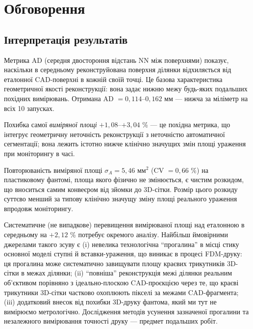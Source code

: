 \documentclass[
  ukrainian,
  10pt,
  a4paper,
  twocolumn]{article}
\begin{document}
\section{Обговорення}\label{ux43eux431ux433ux43eux432ux43eux440ux435ux43dux43dux44f}

\subsection{Інтерпретація
результатів}\label{ux456ux43dux442ux435ux440ux43fux440ux435ux442ux430ux446ux456ux44f-ux440ux435ux437ux443ux43bux44cux442ux430ux442ux456ux432}

Метрика AD (середня двостороння відстань NN між поверхнями) показує,
наскільки в середньому реконструйована поверхня ділянки відхиляється від
еталонної CAD-поверхні в кожній своїй точці. Це базова характеристика
геометричної якості реконструкції: вона задає нижню межу будь-яких
подальших похідних вимірювань. Отримана AD \(= 0,114\)--\(0,162\) мм ---
нижча за міліметр на всіх 10 запусках.

Похибка самої \emph{виміряної площі} \(+1,08\)--\(+3,04\) \% --- це
похідна метрика, що інтегрує геометричну неточність реконструкції з
неточністю автоматичної сегментації; вона лежить істотно нижче клінічно
значущих змін площі ураження при моніторингу в часі.

Повторюваність виміряної площі \(\sigma_A = 5,46\) мм\(^2\) (CV
\(=0,66\) \%) на пластиковому фантомі, площа якого фізично не
змінюється, є чистим розкидом, що вноситься самим конвеєром від зйомки
до 3D-сітки. Розмір цього розкиду суттєво менший за типову клінічно
значущу зміну площі реального ураження впродовж моніторингу.

Систематичне (не випадкове) перевищення вимірюваної площі над еталонною
в середньому на \(+2,12\) \% потребує окремого аналізу. Найбільш
ймовірними джерелами такого зсуву є (i) невелика технологічна
``прогалина'' в місці стику основної моделі ступні й вставки-ураження,
що виникає в процесі FDM-друку: ця прогалина може систематично
завищувати площу краєвих трикутників 3D-сітки в межах ділянки; (ii)
``повніша'' реконструкція межі ділянки реальним об'єктивом порівняно з
ідеально-плоскою CAD-проєкцією через те, що краєві трикутники 3D-сітки
частково охоплюють пікселі за межами CAD-фрагмента; (iii) додатковий
внесок від похибки 3D-друку фантома, який ми тут не вимірюємо
метрологічно. Дослідження методів усунення зазначеної прогалини та
незалежного вимірювання точності друку --- предмет подальших робіт.
\end{document}
